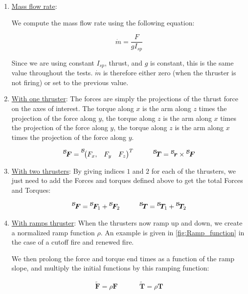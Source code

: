 \begin{enumerate}
	
	\item{\underline{Mass flow rate}}: 
	
	We compute the mass flow rate using the following equation:
	
	\begin{equation}
	\dot{m} = \frac{F}{g I_{sp}}
	\end{equation}
	
	Since we are using constant $I_{sp}$, thrust, and $g$ is constant, this is the same value throughout the tests. $\dot{m}$ is therefore either zero (when the thruster is not firing) or set to the previous value. 
	
	\item{\underline{With one thruster}}: The forces are simply the projections of the thrust force on the axes of interest. The torque along $x$ is the arm along $z$ times the projection of the force along $y$, the torque along $z$ is the arm along $x$ times the projection of the force along $y$, the torque along $z$ is the arm along $x$ times the projection of the force along $y$. 
	
	\begin{align}
		\leftexp{B}{\bm F} =\leftexp{B}{\begin{pmatrix} F_x, & F_y & F_z \end{pmatrix}}^T&\hspace{1cm} \leftexp{B}{\bm T} =\leftexp{B}{\bm r} \times \leftexp{B}{\bm F}  \\
	\end{align}
	
	
	\item{\underline{With two thrusters}}: By giving indices $1$ and $2$ for each of the thrusters, we just need to add the Forces and torques defined above to get the total Forces and Torques:
	
	\begin{align}
		\leftexp{B}{\bm F} = \leftexp{B}{\bm F_1}  + \leftexp{B}{\bm F_2} &\hspace{1cm} \leftexp{B}{\bm T} = \leftexp{B}{\bm T_1}  + \leftexp{B}{\bm T_2} \\ 
	\end{align}
	
	\item{\underline{With ramps thruster}}: When the thrusters now ramp up and down, we create a normalized ramp function $\rho$. An example is given in \ref{fig:Ramp_function} in the case of a cutoff fire and renewed fire. \par
	
	
	
	We then prolong the force and torque end times as a function of the ramp slope, and multiply the initial functions by this ramping function:
	
	\begin{align}
		\tilde{\bm F} = \rho \bm F &\hspace{1cm} \tilde{\bm T} =\rho \bm T  \\ 
	\end{align}
	
\end{enumerate}
